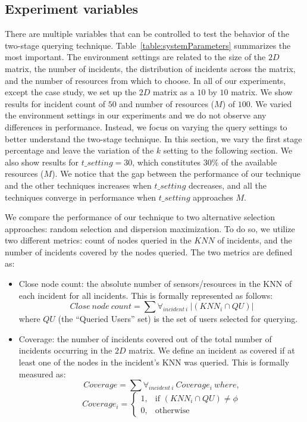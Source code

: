 \documentclass{acm_proc_article-sp}
\begin{document}
\subsection{Experiment variables}
There are multiple variables that can be controlled to test the behavior of the two-stage querying technique. Table~\ref{table:systemParameters} summarizes the most important.
The environment settings are related to the size of the $2D$ matrix, the number of incidents, the distribution of incidents across the matrix, and the number of resources from which to choose. In all of our experiments, except the case study, we set up the $2D$ matrix as a $10$ by $10$ matrix. We show results for incident count of $50$ and number of resources ($M$) of $100$.
We varied the environment settings in our experiments and we do not observe any differences in performance. Instead, we focus on varying the query settings to better understand the two-stage technique. In this section, we vary the first stage percentage and leave the variation of the $k$ setting to the following section. We also show results for $t\_setting = 30$, which constitutes $30\%$ of the available resources ($M$). We notice that the gap between the performance of our technique and the other techniques increases when $t\_setting$ decreases, and all the techniques converge in performance when $t\_setting$ approaches $M$. \par

We compare the performance of our technique to two alternative selection approaches: random selection and dispersion maximization. To do so, we utilize two different metrics: count of nodes queried in the $KNN$ of incidents, and the number of incidents covered by the nodes queried. The two metrics are defined as:
\begin{itemize}
\item Close node count: the absolute number of sensors/resources in the KNN of each incident for all incidents. This is formally represented as follows:
\begin{equation}
Close\ node\ count = \sum \forall_{incident\ i}\ |(KNN_i \cap {QU})|
\end{equation}
where $QU$ (the ``Queried Users'' set) is the set of users selected for querying.
\item Coverage: the number of incidents covered out of the total number of incidents occurring in the $2D$ matrix. We define an incident as covered if at least one of the nodes in the incident's KNN was queried. This is formally measured as:
\begin{equation}
Coverage = \sum \forall_{incident\ i}\ Coverage_i\  where,
\end{equation}
\[
Coverage_i =
\begin{cases}
1,& \text{if }(KNN_i \cap {QU}) \neq \phi\\
0,              & \text{otherwise}
\end{cases}
\]
\end{itemize}
\end{document}
